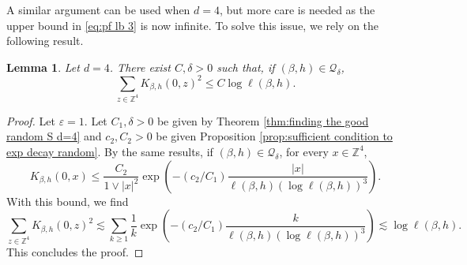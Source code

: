 \documentclass[11pt,a4paper]{article}
\numberwithin{equation}{section}
\theoremstyle{plain}
\newtheorem{Lem}[Thm]{Lemma}
\theoremstyle{definition}
\begin{document}
A similar argument can be used when $d=4$, but more care is needed as the upper bound in \eqref{eq:pf lb 3} is now infinite. To solve this issue, we rely on the following result.
\begin{Lem}\label{lem:bubble of K} Let $d=4$. There exist $C,\delta>0$ such that, if $(\beta,h)\in \mathcal Q_\delta$,
\begin{equation}
	\sum_{z\in \mathbb Z^4} K_{\beta,h}(0,z)^2\leq C\log \ell(\beta,h).
\end{equation}
\end{Lem} 
\begin{proof} Let $\varepsilon=1$. Let $C_1,\delta>0$ be given by Theorem \ref{thm:finding the good random S d=4} and $c_2,C_2>0$ be given Proposition \ref{prop:sufficient condition to exp decay random}. By the same results, if $(\beta,h)\in \mathcal Q_\delta$, for every $x\in \mathbb Z^4$,
\begin{equation}
	K_{\beta,h}(0,x)\leq \frac{C_2}{1\vee |x|^2}\exp\left(-(c_2/C_1)\frac{|x|}{\ell(\beta,h)(\log \ell(\beta,h))^{3}}\right).
\end{equation}
With this bound, we find
\begin{equation}
	\sum_{z\in \mathbb Z^4} K_{\beta,h}(0,z)^2\lesssim \sum_{k\geq 1}\frac{1}{k}\exp\left(-(c_2/C_1)\frac{k}{\ell(\beta,h)(\log \ell(\beta,h))^{3}}\right)\lesssim \log \ell(\beta,h).
\end{equation}
This concludes the proof.
\end{proof}
\end{document}
